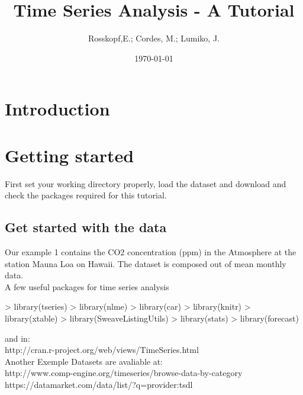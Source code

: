 \documentclass[11pt, a4paper]{article} %
\begin{document}

\title{Time Series Analysis - A Tutorial}
\author{Rosskopf,E.; Cordes, M.; Lumiko, J.}
\date{\today} %
\maketitle
{}
\tableofcontents
\section{Introduction}%



\section{Getting started}%
First set your working directory properly, load the dataset and download and check the packages required for this tutorial. 
\subsection{Get started with the data}%
Our example 1 contains the CO2 concentration (ppm) in the Atmosphere at the station Mauna Loa on Hawaii. The dataset is composed out of mean monthly data. \\

A few useful packages for time series analysis
\begin{Schunk}
\begin{Sinput}
> library(tseries)
> library(nlme)
> library(car)
> library(knitr)
> library(xtable)
> library(SweaveListingUtils)
> library(stats)
> library(forecast)
\end{Sinput}
\end{Schunk}
and in:\\

http://cran.r-project.org/web/views/TimeSeries.html\\

Another Exemple Datasets are avaliable at:\\

http://www.comp-engine.org/timeseries/browse-data-by-category\\
https://datamarket.com/data/list/?q=provider:tsdl\\
\end{document}
